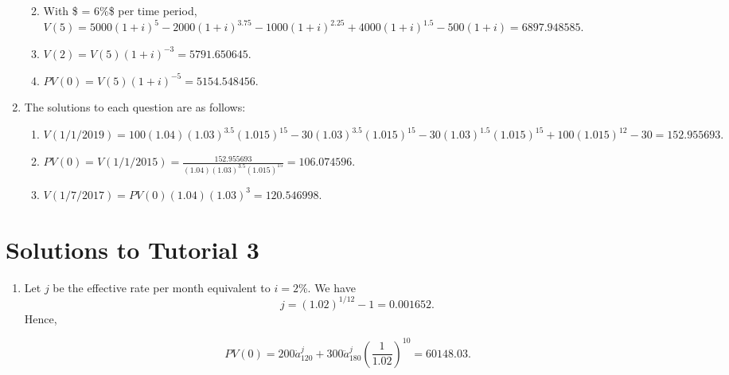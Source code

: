 \documentclass[
]{book}
\providecommand{\tightlist}{%
  \setlength{\itemsep}{0pt}\setlength{\parskip}{0pt}}
\theoremstyle{definition}
\theoremstyle{definition}
\theoremstyle{definition}
\theoremstyle{definition}
\theoremstyle{remark}
\begin{document}
\begin{enumerate}
  \begin{enumerate}
  \def\labelenumii{\arabic{enumii}.}
  \tightlist
  \item
    With \$ = 6\%\$ per time period, \(V(5) = 5000 (1+i)^5 - 2000(1+i)^{3.75} - 1000 (1+i)^{2.25} + 4000 (1+i)^{1.5} - 500(1+i) = 6897.948585.\)
  \item
    \(V(2) = V(5)(1+i)^{-3} = 5791.650645.\)
  \item
    \(PV(0) = V(5)(1+i)^{-5} = 5154.548456.\)
  \end{enumerate}
\item
  The solutions to each question are as follows:

  \begin{enumerate}
  \def\labelenumii{\arabic{enumii}.}
  \tightlist
  \item
    \(V(1/1/2019) = 100(1.04)(1.03)^{3.5}(1.015)^{15} - 30 (1.03)^{3.5}     (1.015)^{15}- 30 (1.03)^{1.5} (1.015)^{15} + 100 (1.015)^{12} - 30 = 152.955693.\)
  \item
    \(PV(0)= V(1/1/2015) = \frac{152.955693}{(1.04)(1.03)^{3.5}(1.015)^{15}} =106.074596.\)
  \item
    \(V(1/7/2017) = PV(0)(1.04)(1.03)^3 = 120.546998.\)
  \end{enumerate}
\end{enumerate}

\section{Solutions to Tutorial 3}\label{solutions-to-tutorial-3}

\begin{enumerate}
\def\labelenumi{\arabic{enumi}.}
\tightlist
\item
  Let \(j\) be the effective rate per month equivalent to \(i = 2\)\%. We have
  \[ j = (1.02)^{1/12}  - 1= 0.001652. \]
  Hence,
\end{enumerate}

\[ PV(0) = 200 \ddot{a}^{j}_{120} + 300 \ddot{a}^{j}_{180} \left( \frac{1}{1.02} \right)^{10} = 60148.03. \]
\end{document}
